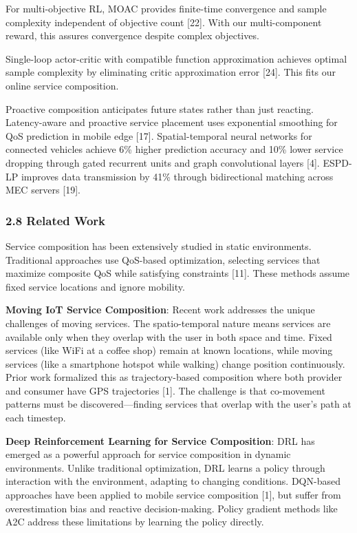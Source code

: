 \documentclass[
  10pt,
  twocolumn,
]{article}
\begin{document}
For multi-objective RL, MOAC provides finite-time convergence and sample
complexity independent of objective count {[}22{]}. With our
multi-component reward, this assures convergence despite complex
objectives.

Single-loop actor-critic with compatible function approximation achieves
optimal sample complexity by eliminating critic approximation error
{[}24{]}. This fits our online service composition.

Proactive composition anticipates future states rather than just
reacting. Latency-aware and proactive service placement uses exponential
smoothing for QoS prediction in mobile edge {[}17{]}. Spatial-temporal
neural networks for connected vehicles achieve 6\% higher prediction
accuracy and 10\% lower service dropping through gated recurrent units
and graph convolutional layers {[}4{]}. ESPD-LP improves data
transmission by 41\% through bidirectional matching across MEC servers
{[}19{]}.

\hypertarget{related-work}{%
	\subsubsection{2.8 Related Work}\label{related-work}}

Service composition has been extensively studied in static environments.
Traditional approaches use QoS-based optimization, selecting services
that maximize composite QoS while satisfying constraints {[}11{]}. These
methods assume fixed service locations and ignore mobility.

\textbf{Moving IoT Service Composition}: Recent work addresses the
unique challenges of moving services. The spatio-temporal nature means
services are available only when they overlap with the user in both
space and time. Fixed services (like WiFi at a coffee shop) remain at
known locations, while moving services (like a smartphone hotspot while
walking) change position continuously. Prior work formalized this as
trajectory-based composition where both provider and consumer have GPS
trajectories {[}1{]}. The challenge is that co-movement patterns must be
discovered---finding services that overlap with the user's path at each
timestep.

\textbf{Deep Reinforcement Learning for Service Composition}: DRL has
emerged as a powerful approach for service composition in dynamic
environments. Unlike traditional optimization, DRL learns a policy
through interaction with the environment, adapting to changing
conditions. DQN-based approaches have been applied to mobile service
composition {[}1{]}, but suffer from overestimation bias and reactive
decision-making. Policy gradient methods like A2C address these
limitations by learning the policy directly.
\end{document}
